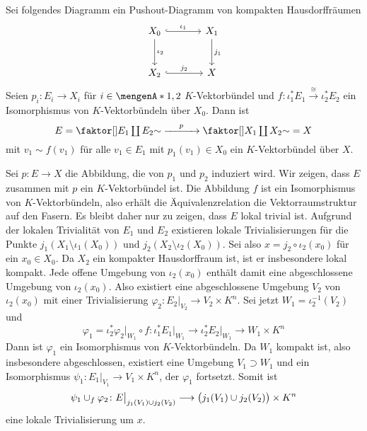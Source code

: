 \begin{lemma}[label=sub:37,{name=[Vektorbündel über einem Pushout]}]
Sei folgendes Diagramm ein Pushout-Diagramm von kompakten Hausdorffräumen
\[
	\begin{tikzcd}[sep=large]
		X_0 \rar[hook,"\iota_1"] \dar["\iota_2"]& X_1 \dar["j_1"] \\
		X_2 \rar[hook,"j_2"] & X
	\end{tikzcd}
\]
Seien $p_i \colon E_i \to X_i$ für $i \in \set{1,2}$ $K$-Vektorbündel und $f \colon \iota_1^* E_1 \xrightarrow{\cong} \iota_2^* E_2 $ ein Isomorphismus von $K$-Vektorbündeln 
über $X_0$. Dann ist
\[
	E = \Faktor{E_1 \coprod E_2}{\sim} \xrightarrow{\minwidthbox{p}{3em}} \Faktor{X_1 \coprod X_2 }{\sim}=X
\]
mit $v_1 \sim f(v_1)$ für alle $v_1 \in E_1$ mit $p_1(v_1) \in X_0$ ein $K$-Vektorbündel über $X$.	
\end{lemma}
\begin{beweis}
Sei $p \colon E \to X$ die Abbildung, die von $p_1$ und $p_2$ induziert wird. Wir zeigen, dass $E$ zusammen mit $p$ ein $K$-Vektorbündel ist. Die Abbildung $f$ ist ein
Isomorphismus von $K$-Vektorbündeln, also erhält die Äquivalenzrelation die Vektorraumstruktur auf den Fasern. Es bleibt daher nur zu zeigen, dass $E$ lokal trivial ist.
Aufgrund der lokalen Trivialität von $E_1$ und $E_2$ existieren lokale Trivialisierungen für die Punkte $j_1(X_1 \setminus \iota_1(X_0))$ und 
$j_2(X_2 \setminus \iota_2(X_0))$. Sei also $x= j_2 \circ \iota_2(x_0)$ für ein $x_0 \in X_0$. Da $X_2$ ein kompakter Hausdorffraum ist, ist er insbesondere lokal kompakt. Jede offene Umgebung von $\iota_2(x_0)$
enthält damit eine abgeschlossene Umgebung von $\iota_2(x_0)$. Also existiert eine abgeschlossene Umgebung $V_2$ von $\iota_2(x_0)$ mit einer Trivialisierung 
$\varphi_2 \colon E_2|_{V_2} \to V_2 \times K^n$. Sei jetzt $W_1 = \iota_2^{-1}(V_2)$ und
\[
	\varphi_1 = \iota_2^* \varphi_2\big|_{W_1} \circ f \colon \iota_1^* E_1\big|_{W_1} \longrightarrow \iota_2^*E_2\big|_{W_1} \longrightarrow W_1 \times K^n
\]
Dann ist $\varphi_1$ ein Isomorphismus von $K$-Vektorbündeln. Da $W_1$ kompakt ist, also insbesondere abgeschlossen, existiert eine Umgebung $V_1 \supset W_1$ und ein 
Isomorphismus $\psi_1 \colon E_1|_{V_1} \to V_1 \times K^n$, der $\varphi_1$ fortsetzt. Somit ist
\[
	\psi_1 \cup_f \varphi_2 \colon E\big|_{j_1(V_1) \cup j_2(V_2)} \longrightarrow \enbrace[\big]{j_1(V_1) \cup j_2(V_2)} \times K^n 
\]
eine lokale Trivialisierung um $x$.
\end{beweis}

